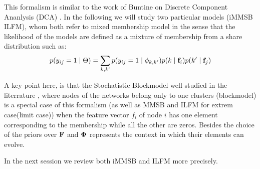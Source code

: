 This formalism is similar to the work of Buntine on Discrete Component Ananlysis (DCA) \cite{DCA}. In the following we will study two particular models (iMMSB ILFM), whom both refer to mixed membership model in the sense that the likelihood of the models are defined as a mixture of membership from a share distribution such as:
\begin{equation}
p(y_{ij}=1 \mid \Theta ) = \sum_{k, k'} p(y_{ij}=1\mid\phi_{k,k'}) p(k \mid \mathbf{f}_i) p(k' \mid \mathbf{f}_j)
\end{equation}

A key point here, is that the Stochatistic Blockmodel well studied in the literrature \cite{goldenberg2010survey}, where nodes of the networks belong only to one clusters (blockmodel) is a special case of this formalism (as well as MMSB and ILFM for extrem case(limit case)) when the feature vector $f_i$ of node $i$ has one element corresponding to the membership while all the other are zeros. Besides the choice of the priors over $\mathbf{F}$ and $\mathbf{\Phi}$ represents the context in which  their elements can evolve.

In the next session we review both iMMSB and ILFM more precisely.

